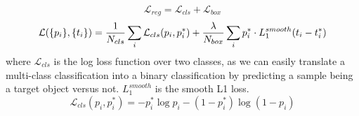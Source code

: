 \begin{equation}
	\mathcal{L}_{reg} = \mathcal{L}_{cls} + \mathcal{L}_{box}
\end{equation}
\begin{equation}
	\mathcal{L}(\{p_i\}, \{t_i\})= \frac{1}{N_{cls}} \sum_i \mathcal{L}_{cls} (p_i, p^*_i) + \frac{\lambda}{N_{box}} \sum_i p^*_i \cdot L_1^{smooth}(t_i - t^*_i) \\
\end{equation}
where \(\mathcal{L}_{cls}\) is the log loss function over two classes, as we can easily translate a multi-class classification into a binary classification by predicting a sample being a target object versus not. \(L_1^{smooth}\) is the smooth L1 loss.
\begin{equation}
	\mathcal{L}_{cls} (p_i, p^*_i) = - p^*_i \log p_i - (1 - p^*_i) \log (1 - p_i)
\end{equation}
